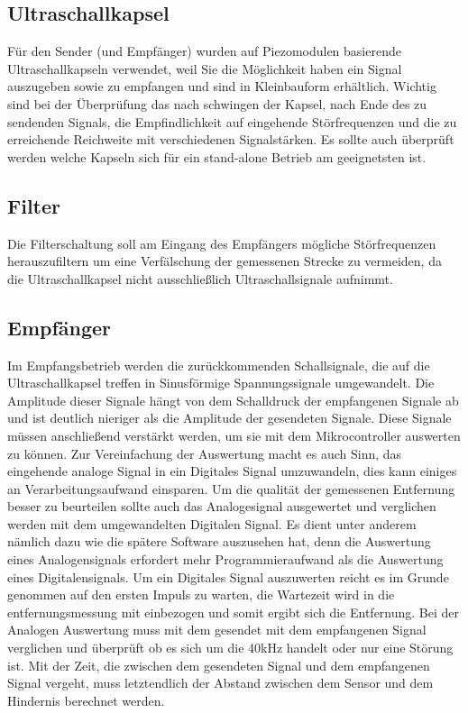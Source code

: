 \subsection{Ultraschallkapsel}
Für den Sender (und Empfänger) wurden auf Piezomodulen basierende Ultraschallkapseln verwendet, weil Sie die Möglichkeit haben ein Signal auszugeben sowie zu empfangen und sind in Kleinbauform erhältlich. Wichtig sind bei der Überprüfung das nach schwingen der Kapsel, nach Ende des zu sendenden Signals, die Empfindlichkeit auf eingehende Störfrequenzen und die zu erreichende Reichweite mit verschiedenen Signalstärken. Es sollte auch überprüft werden welche Kapseln sich für ein stand-alone Betrieb am geeignetsten ist.

\subsection{Filter}
Die Filterschaltung soll am Eingang des Empfängers mögliche Störfrequenzen herauszufiltern um eine Verfälschung der gemessenen Strecke zu vermeiden, da die Ultraschallkapsel nicht ausschließlich Ultraschallsignale aufnimmt.

\subsection{Empfänger}
Im Empfangsbetrieb werden die zurückkommenden Schallsignale, die auf die Ultraschallkapsel treffen in Sinusförmige Spannungssignale umgewandelt. Die Amplitude dieser Signale hängt von dem Schalldruck der empfangenen Signale ab und ist deutlich nieriger als die Amplitude der gesendeten Signale. Diese Signale müssen anschließend verstärkt werden, um sie mit dem Mikrocontroller auswerten zu können. Zur Vereinfachung der Auswertung macht es auch Sinn, das eingehende analoge Signal in ein Digitales Signal umzuwandeln, dies kann einiges an Verarbeitungsaufwand einsparen. Um die qualität der gemessenen Entfernung besser zu beurteilen sollte auch das Analogesignal ausgewertet und verglichen werden mit dem umgewandelten Digitalen Signal. Es dient unter anderem nämlich dazu wie die spätere Software auszusehen hat, denn die Auswertung eines Analogensignals erfordert mehr Programmieraufwand als die Auswertung eines Digitalensignals. Um ein Digitales Signal auszuwerten reicht es im Grunde genommen auf den ersten Impuls zu warten, die Wartezeit wird in die entfernungsmessung mit einbezogen und somit ergibt sich die Entfernung. Bei der Analogen Auswertung muss mit dem gesendet mit dem empfangenen Signal verglichen und überprüft ob es sich um die 40kHz handelt oder nur eine Störung ist.
Mit der Zeit, die zwischen dem gesendeten Signal und dem empfangenen Signal vergeht, muss letztendlich der Abstand zwischen dem Sensor und dem Hindernis berechnet werden.
